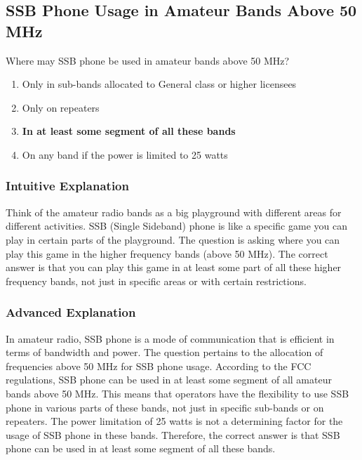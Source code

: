 \subsection{SSB Phone Usage in Amateur Bands Above 50 MHz}
\label{T1B10}

\begin{tcolorbox}[colback=gray!10!white,colframe=black!75!black,title=T1B10]
Where may SSB phone be used in amateur bands above 50 MHz?
\begin{enumerate}[label=\Alph*),noitemsep]
    \item Only in sub-bands allocated to General class or higher licensees
    \item Only on repeaters
    \item \textbf{In at least some segment of all these bands}
    \item On any band if the power is limited to 25 watts
\end{enumerate}
\end{tcolorbox}

\subsubsection*{Intuitive Explanation}
Think of the amateur radio bands as a big playground with different areas for different activities. SSB (Single Sideband) phone is like a specific game you can play in certain parts of the playground. The question is asking where you can play this game in the higher frequency bands (above 50 MHz). The correct answer is that you can play this game in at least some part of all these higher frequency bands, not just in specific areas or with certain restrictions.

\subsubsection*{Advanced Explanation}
In amateur radio, SSB phone is a mode of communication that is efficient in terms of bandwidth and power. The question pertains to the allocation of frequencies above 50 MHz for SSB phone usage. According to the FCC regulations, SSB phone can be used in at least some segment of all amateur bands above 50 MHz. This means that operators have the flexibility to use SSB phone in various parts of these bands, not just in specific sub-bands or on repeaters. The power limitation of 25 watts is not a determining factor for the usage of SSB phone in these bands. Therefore, the correct answer is that SSB phone can be used in at least some segment of all these bands.